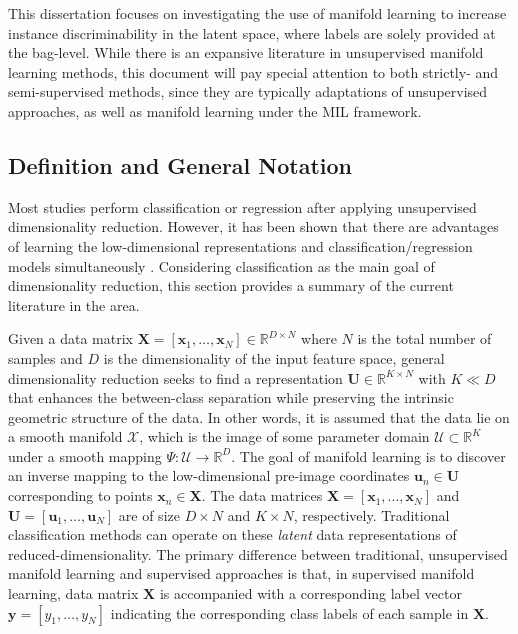 This dissertation focuses on investigating the use of manifold learning to increase instance discriminability in the latent space, where labels are solely provided at the bag-level.   While there is an expansive literature in unsupervised manifold learning methods, this document will pay special attention to both strictly- and semi-supervised methods, since they are typically adaptations of unsupervised approaches, as well as manifold learning under the MIL framework.

\subsection{Definition and General Notation}
Most studies perform classification or regression after applying unsupervised dimensionality reduction.  However, it has been shown that there are advantages of learning the low-dimensional representations and classification/regression models simultaneously \citep{Chao2019RecentAdvancesSupervisedDimRed,Rish2008SupDimRedGLM}.  Considering classification as the main goal of dimensionality reduction, this section provides a summary of the current literature in the area. \newline

Given a data matrix $\bm{X} = [\bm{x}_1, \dots, \bm{x}_N]\in \mathbb{R}^{D \times N}$ where $N$ is the total number of samples and $D$ is the dimensionality of the input feature space, general dimensionality reduction seeks to find a representation $\bm{U} \in \mathbb{R}^{K \times N}$ with $K \ll D$ that enhances the between-class separation while preserving the intrinsic geometric structure of the data\citep{Vural2018StudySupervisedManifoldLearning}.  In other words, it is assumed that the data lie on a smooth manifold $\mathcal{X}$, which is the image of some parameter domain $\mathcal{U} \subset \mathbb{R}^{K}$ under a smooth mapping $\Psi : \mathcal{U} \rightarrow \mathbb{R}^{D}$.  The goal of manifold learning is to discover an inverse mapping to the low-dimensional pre-image coordinates $\bm{u}_n \in \bm{U}$ corresponding to points $\bm{x}_n \in \bm{X}$.  The data matrices $\bm{X} = [\bm{x}_1, \dots, \bm{x}_N]$ and $\bm{U} = [\bm{u}_1, \dots, \bm{u}_N]$  are of size $D \times N$ and $K \times N$, respectively.  Traditional classification methods can operate on these \textit{latent} data representations of reduced-dimensionality. The primary difference between traditional, unsupervised manifold learning and supervised approaches is that, in supervised manifold learning, data matrix $\bm{X} $ is accompanied with a corresponding label vector $\bm{y} = [y_1, \dots, y_N]$ indicating the corresponding class labels of each sample in $\bm{X}$. \newline

